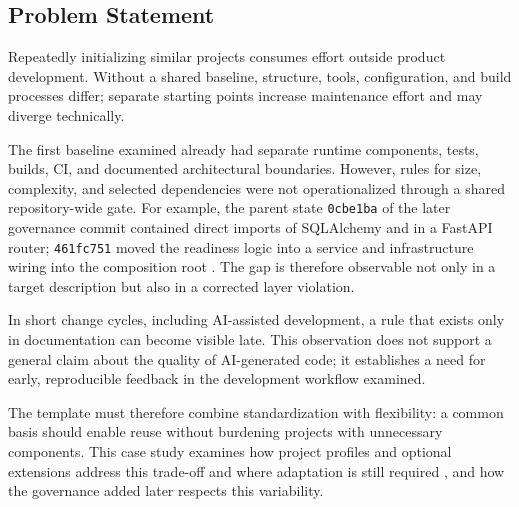 \subsection{Problem Statement}
\label{subsec:problemstellung}

Repeatedly initializing similar projects consumes effort outside product
development. Without a shared baseline, structure, tools, configuration, and
build processes differ; separate starting points increase maintenance effort
and may diverge technically.

The first baseline examined already had separate runtime components, tests,
builds, CI, and documented architectural boundaries. However, rules for size,
complexity, and selected dependencies were not operationalized through a
shared repository-wide gate. For example, the parent state
\texttt{0cbe1ba} of the later governance commit contained direct imports of
SQLAlchemy and  in a FastAPI router; \texttt{461fc751} moved the
readiness logic into a service and infrastructure wiring into the composition
root \parencite{kleiveist2026governance-commit}. The gap is therefore
observable not only in a target description but also in a corrected layer
violation.

In short change cycles, including AI-assisted development, a rule that exists
only in documentation can become visible late. This observation does not
support a general claim about the quality of AI-generated code; it establishes
a need for early, reproducible feedback in the development workflow examined.

The template must therefore combine standardization with flexibility: a common
basis should enable reuse without burdening projects with unnecessary
components. This case study examines how project profiles and optional
extensions address this trade-off and where adaptation is still required
\parencite{kleiveist2026architecture,kleiveist2026profiles}, and how the
governance added later respects this variability.
